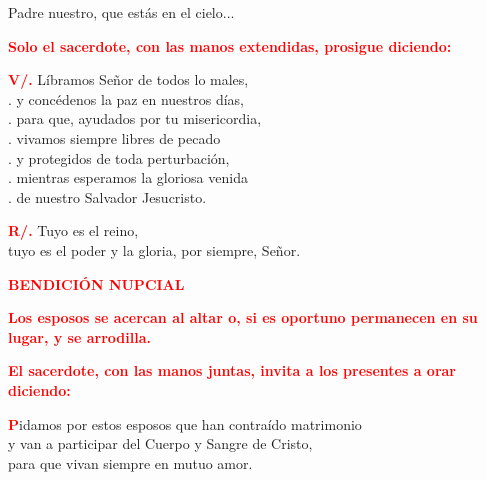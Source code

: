 \documentclass[12pt, letterpaper]{report}
\begin{document}
\Large Padre nuestro, que est\'as en el cielo...\newline

\large{\bfseries \textcolor{red}{Solo el sacerdote, con las manos extendidas, prosigue diciendo:}}\newline

\Large \hspace{-0.9cm} {\bfseries \textcolor{red}{V/.}} \hspace{0.5cm} L\'ibramos Se\~nor de todos lo males,\\
. \hspace{1cm} y conc\'edenos la paz en nuestros d\'ias,\\
. \hspace{1cm} para que, ayudados por tu misericordia,\\
. \hspace{1cm} vivamos siempre libres de pecado\\
. \hspace{1cm} y protegidos de toda perturbaci\'on,\\
. \hspace{1cm} mientras esperamos la gloriosa venida\\
. \hspace{1cm} de nuestro Salvador Jesucristo.\newline

\Large \hspace{-0.9cm} {\bfseries \textcolor{red}{R/.}} \hspace{0.5cm} Tuyo es el reino,\\
tuyo es el poder y la gloria, por siempre, Se\~nor. \newline

\newpage

\Large {\bfseries \textcolor{red}{BENDICI\'ON NUPCIAL}} \newline

\large{\bfseries \textcolor{red}{Los esposos se acercan al altar o,
si es oportuno permanecen en su lugar, y se arrodilla.}}\newline

\large{\bfseries \textcolor{red}{El sacerdote, con las manos juntas, invita a los presentes a orar diciendo:}}

\lettrine[lines=1]{\bfseries \textcolor{red}{P}}{}\Large idamos por estos esposos que han contra\'ido matrimonio \\
y van a participar del Cuerpo y Sangre de Cristo, \\
para que vivan siempre en mutuo amor.\newline
\end{document}
